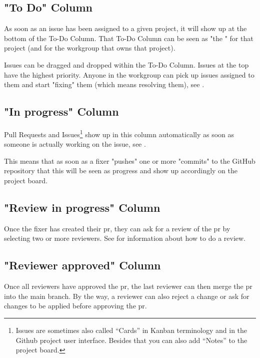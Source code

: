 \subsection{"To Do" Column}
\label{subsec:ekg-mm-process-to-do-column}

As soon as an issue has been assigned to a given project, 
it will show up at the bottom of the To-Do Column.
That To-Do Column can be seen as "the "
for that project (and for the workgroup that owns that project).

Issues can be dragged and dropped within the To-Do Column. 
Issues at the top have the highest priority. 
Anyone in the workgroup can pick up issues assigned to 
them and start "fixing" them (which means resolving them), 
see .

\subsection{"In progress" Column}

Pull Requests and Issues\footnote{Issues are sometimes also 
called “Cards” in Kanban terminology and in the Github project 
user interface.
Besides that you can also add “Notes” to the project board.} 
show up in this column automatically as soon as someone is 
actually working on the issue, see .

This means that as soon as a fixer "pushes" one or more "commits" 
to the GitHub repository that this will be seen as progress 
and show up accordingly on the project board.

\subsection{"Review in progress" Column}

Once the fixer has created their \gls{pr}, they can ask 
for a review of the \gls{pr} by selecting two or more reviewers. 
See  for information about how to do a review.

\subsection{"Reviewer approved" Column}

Once all reviewers have approved the \gls{pr}, 
the last reviewer can then merge the \gls{pr} into the main branch. 
By the way, a reviewer can also reject a change or ask for 
changes to be applied before approving the \gls{pr}. 

